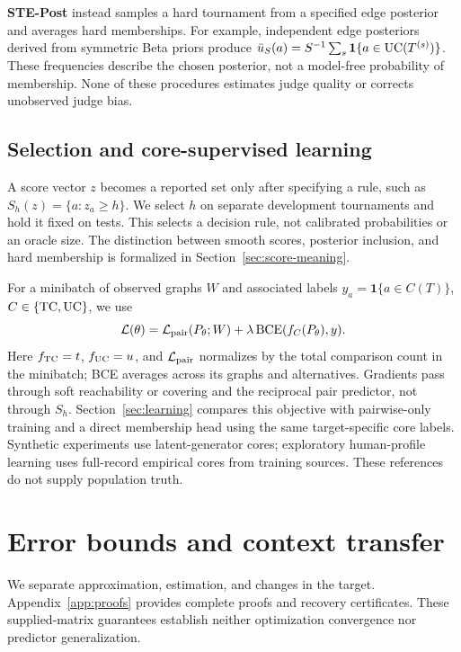 \textbf{STE-Post} instead samples a hard tournament from a specified edge posterior and averages hard memberships. For example, independent edge posteriors derived from symmetric Beta priors produce $\bar u_S(a)=S^{-1}\sum_s\mathbf1\{a\in\mathrm{UC}(T^{(s)})\}$. These frequencies describe the chosen posterior, not a model-free probability of membership. None of these procedures estimates judge quality or corrects unobserved judge bias.  

\subsection{Selection and core-supervised learning}\label{sec:training-objective}
A score vector $z$ becomes a reported set only after specifying a rule, such as $S_h(z)=\{a:z_a\ge h\}$. We select $h$ on separate development tournaments and hold it fixed on tests. This selects a decision rule, not calibrated probabilities or an oracle size. The distinction between smooth scores, posterior inclusion, and hard membership is formalized in Section~\ref{sec:score-meaning}.

For a minibatch of observed graphs $W$ and associated labels $y_a=\mathbf1\{a\in C(T)\}$, $C\in\{\mathrm{TC},\mathrm{UC}\}$, we use
\begin{equation}\label{eq:coretraining}
\mathcal L(\theta)=\mathcal L_{\rm pair}(P_\theta;W)
+\lambda\operatorname{BCE}(f_C(P_\theta),y).
\end{equation}
Here $f_{\mathrm{TC}}=t$, $f_{\mathrm{UC}}=u$, and $\mathcal L_{\rm pair}$ normalizes by the total comparison count in the minibatch; BCE averages across its graphs and alternatives. Gradients pass through soft reachability or covering and the reciprocal pair predictor, not through $S_h$. Section~\ref{sec:learning} compares this objective with pairwise-only training and a direct membership head using the same target-specific core labels. Synthetic experiments use latent-generator cores; exploratory human-profile learning uses full-record empirical cores from training sources. These references do not supply population truth.

\section{Error bounds and context transfer}\label{sec:theory}
We separate approximation, estimation, and changes in the target. Appendix~\ref{app:proofs} provides complete proofs and recovery certificates. These supplied-matrix guarantees establish neither optimization convergence nor predictor generalization.

